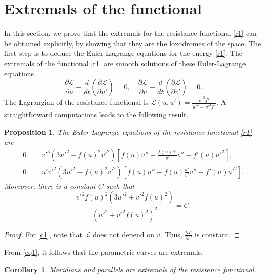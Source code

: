 \documentclass[a4paper,12pt]{amsart}
\newtheorem{corollary}[theorem]{Corollary}
\newtheorem{proposition}[theorem]{Proposition}
\theoremstyle{definition}
\begin{document}
 \section{Extremals of the functional}\label{s3}

In this section, we prove that the extremals for the resistance functional \eqref{r1} can be obtained explicitly, by showing that they   are the loxodromes of the space. The first step is to  deduce the Euler-Lagrange equations for the energy \eqref{r1}. The extremals of the functional    \eqref{r1} are smooth solutions of these Euler-Lagrange equations
$$\frac{\partial \mathcal{L}}{\partial u} - \frac{d}{dt} \left( \frac{\partial \mathcal{L}}{\partial u'} \right)=0, \quad \frac{\partial \mathcal{L}}{\partial v} - \frac{d}{dt} \left( \frac{\partial \mathcal{L}}{\partial v'} \right)=0.$$
 The Lagrangian of the resistance functional is $\mathcal{L}(u, u') = \frac{v'^3f^2}{ u'^2+v'^2f^2}$. A straightforward computations leads to  the following result. 

 
 \begin{proposition}  The Euler-Lagrange equations of the resistance functional \eqref{r1} are
 \begin{equation}\label{eq1}
 \begin{split}
 0&= v'^3 \left( 3u'^2 - f(u)^2 v'^2 \right) \left[ f(u) u'' - \frac{f(u) u'}{v'} v'' - f'(u) u'^2 \right] ,\\
 0&= u' v'^2 \left( 3u'^2 - f(u)^2 v'^2 \right) \left[ f(u) u'' - f(u) \frac{u'}{v'} v'' - f'(u) u'^2 \right].
 \end{split}
 \end{equation}
 Moreover, there is a constant $C$ such that
 \begin{equation}\label{c1}
 \frac{v'^2 f(u)^2 (3u'^2 + v'^2 f(u)^2)}{(u'^2 + v'^2 f(u)^2)^2} = C.
 \end{equation}
 \end{proposition}
 
 \begin{proof}
   For \eqref{c1}, note that $\mathcal{L}$ does not depend on $v$. Thus, $\frac{\partial \mathcal{L}}{\partial v'} $ is constant. 
 \end{proof}



From \eqref{eq1}, it follows that the parametric curves are extremals. 

\begin{corollary}
Meridians and parallels are extremals of the resistance functional.
 \end{corollary}
 
\end{document}
